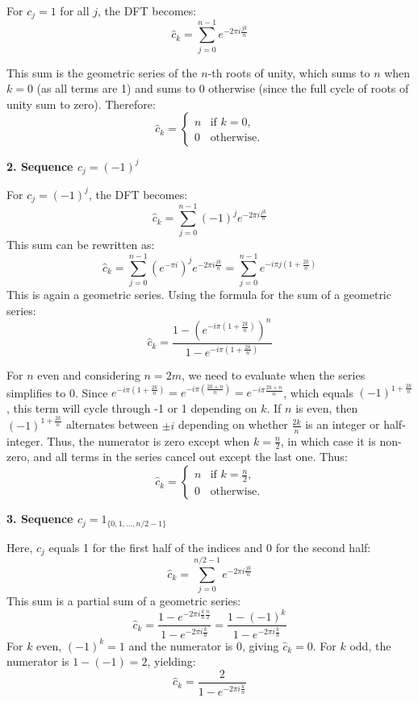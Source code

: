 \documentclass[8pt]{article}
\begin{document}
For \( c_j = 1 \) for all \( j \), the DFT becomes:
\[
\hat{c}_k = \sum_{j=0}^{n-1} e^{-2\pi i \frac{jk}{n}}
\]

This sum is the geometric series of the \( n \)-th roots of unity, which sums to \( n \) when \( k = 0 \) (as all terms are 1) and sums to 0 otherwise (since the full cycle of roots of unity sum to zero). Therefore:
\[
\hat{c}_k = 
\begin{cases} 
n & \text{if } k = 0, \\
0 & \text{otherwise}.
\end{cases}
\]

\textbf{2. Sequence \( c_j = (-1)^j \)}

For \( c_j = (-1)^j \), the DFT becomes:
\[
\hat{c}_k = \sum_{j=0}^{n-1} (-1)^j e^{-2\pi i \frac{jk}{n}}
\]
This sum can be rewritten as:
\[
\hat{c}_k = \sum_{j=0}^{n-1} (e^{-\pi i})^j e^{-2\pi i \frac{jk}{n}} = \sum_{j=0}^{n-1} e^{-i\pi j(1 + \frac{2k}{n})}
\]
This is again a geometric series. Using the formula for the sum of a geometric series:
\[
\hat{c}_k = \frac{1 - (e^{-i\pi (1 + \frac{2k}{n})})^n}{1 - e^{-i\pi (1 + \frac{2k}{n})}}
\]

For \( n \) even and considering \( n = 2m \), we need to evaluate when the series simplifies to 0. Since \( e^{-i\pi (1 + \frac{2k}{n})} = e^{-i\pi (\frac{2k+n}{n})} = e^{-i\pi \frac{2k+n}{n}} \), which equals \( (-1)^{1+\frac{2k}{n}} \), this term will cycle through -1 or 1 depending on \( k \). If \( n \) is even, then \( (-1)^{1+\frac{2k}{n}} \) alternates between \( \pm i \) depending on whether \( \frac{2k}{n} \) is an integer or half-integer. Thus, the numerator is zero except when \( k = \frac{n}{2} \), in which case it is non-zero, and all terms in the series cancel out except the last one. Thus:
\[
\hat{c}_k = 
\begin{cases} 
n & \text{if } k = \frac{n}{2}, \\
0 & \text{otherwise}.
\end{cases}
\]

\textbf{3. Sequence \( c_j = 1_{\{0,1,\ldots,n/2-1\}} \)}

Here, \( c_j \) equals 1 for the first half of the indices and 0 for the second half:
\[
\hat{c}_k = \sum_{j=0}^{n/2-1} e^{-2\pi i \frac{jk}{n}}
\]
This sum is a partial sum of a geometric series:
\[
\hat{c}_k = \frac{1 - e^{-2\pi i \frac{k}{n} \frac{n}{2}}}{1 - e^{-2\pi i \frac{k}{n}}} = \frac{1 - (-1)^k}{1 - e^{-2\pi i \frac{k}{n}}}
\]
For \( k \) even, \( (-1)^k = 1 \) and the numerator is 0, giving \( \hat{c}_k = 0 \). For \( k \) odd, the numerator is \( 1 - (-1) = 2 \), yielding:
\[
\hat{c}_k = \frac{2}{1 - e^{-2\pi i \frac{k}{n}}}
\]
\end{document}
